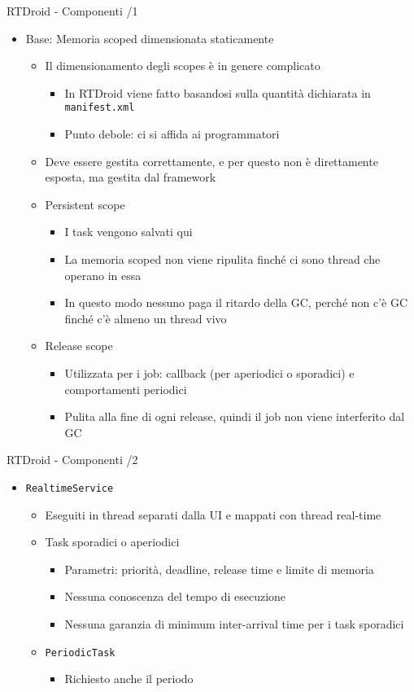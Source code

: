\begin{frame}{RTDroid - Componenti /1}
	\begin{itemize}
		\item Base: Memoria scoped dimensionata staticamente
		\begin{itemize}
			\item Il dimensionamento degli scopes è in genere complicato
			\begin{itemize}
				\item In RTDroid viene fatto basandosi sulla quantità dichiarata in \texttt{manifest.xml}
				\item Punto debole: ci si affida ai programmatori
			\end{itemize}
			\item Deve essere gestita correttamente, e per questo non è direttamente esposta, ma gestita dal framework
			\item Persistent scope
			\begin{itemize}
				\item I task vengono salvati qui
				\item La memoria scoped non viene ripulita finché ci sono thread che operano in essa
				\item In questo modo nessuno paga il ritardo della GC, perché non c'è GC finché c'è almeno un thread vivo
			\end{itemize}
			\item Release scope
			\begin{itemize}
				\item Utilizzata per i job: callback (per aperiodici o sporadici) e comportamenti periodici
				\item Pulita alla fine di ogni release, quindi il job non viene interferito dal GC
			\end{itemize}
		\end{itemize}
	\end{itemize}
\end{frame}
\begin{frame}{RTDroid - Componenti /2}
	\begin{itemize}
		\item \texttt{RealtimeService}
		\begin{itemize}
			\item Eseguiti in thread separati dalla UI e mappati con thread real-time
			\item Task sporadici o aperiodici
			\begin{itemize}
				\item Parametri: priorità, deadline, release time e limite di memoria
				\item Nessuna conoscenza del tempo di esecuzione
				\item Nessuna garanzia di minimum inter-arrival time per i task sporadici
			\end{itemize}
			\item \texttt{PeriodicTask}
			\begin{itemize}
				\item Richiesto anche il periodo
			\end{itemize}
		\end{itemize}
	\end{itemize}
\end{frame}
